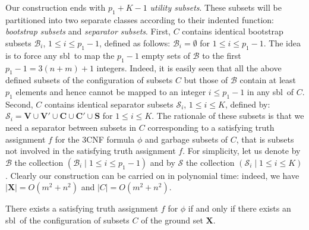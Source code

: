 \documentclass[a4paper,10pt]{llncs}
\newcommand{\SBL}{sbl}
\begin{document}
Our construction ends with $p_1 + K - 1$ \emph{utility subsets}. 
These subsets will be partitioned into two separate classes according to their 
indented function: \emph{bootstrap subsets} and \emph{separator subsets}. 
First, $C$ contains identical bootstrap subsets 
$\mathcal{B}_i$, $1 \leq i \leq p_1 - 1$, defined as follows:
$\mathcal{B}_i = \emptyset$ for $1 \leq i \leq p_1 - 1$. The idea is to force any \SBL\ to map the $p_1 - 1$ 
empty sets of $\mathcal{B}$ to the first $p_1  - 1 = 3(n + m) + 1$ integers. 
Indeed, it is easily seen that all the above defined subsets of the configuration 
of subsets $C$ but those of $\mathcal{B}$ contain at least $p_1$ elements and 
hence cannot be mapped to an integer $i \leq p_1 - 1$ in any \SBL\ of 
$C$. 
Second, $C$ contains identical separator subsets $\mathcal{S}_i$, $1 \leq i \leq K$, 
defined by:
$\mathcal{S}_i = 
\mathbf{V} \cup \mathbf{V}' \cup \mathbf{C} \cup \mathbf{C}' \cup \mathbf{S}$
for $1 \leq i \leq K$.
The rationale of these subsets is that we need a separator between subsets in $C$ 
corresponding to a satisfying truth assignment $f$ for the $3$CNF formula $\phi$ 
and garbage subsets of $C$, that is subsets not involved in the satisfying truth 
assignment $f$. For simplicity, let us denote by $\mathcal{B}$ the collection 
$(\mathcal{B}_i \mid 1 \leq i \leq p_1 - 1)$ and by $\mathcal{S}$ 
the collection $(\mathcal{S}_i \mid 1 \leq i \leq K)$. 
Clearly our construction can be carried on in polynomial time: indeed, we have
$|\mathbf{X}| = O(m^2 + n^2)$ and
$|C| = O(m^2 + n^2)$.

\begin{lemma}
  \label{lemma:Stepwise Bounded Labeling is NPC}
  There exists a satisfying truth assignment $f$ for $\phi$ if and only if 
  there exists an \SBL\ of the configuration of subsets 
  $C$ of the ground set $\mathbf{X}$.
\end{lemma} 
\end{document}
